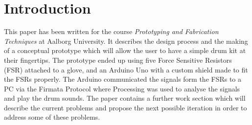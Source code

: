 \section*{Introduction}
\label{Introduktion}
This paper has been written for the course \textit{Prototyping and Fabrication Techniques} at Aalborg University. It describes the design process and the making of a conceptual prototype which will allow the user to have a simple drum kit at their fingertips. The prototype ended up using five Force Sensitive Resistors (FSR) attached to a glove, and an Arduino Uno with a custom shield made to fit the FSRs properly. The Arduino communicated the signals form the FSRs to a PC via the Firmata Protocol where Processing was used to analyse the signals and play the drum sounds. The paper contains a further work section which will describe the current problems and propose the next possible iteration in order to address some of these problems.
